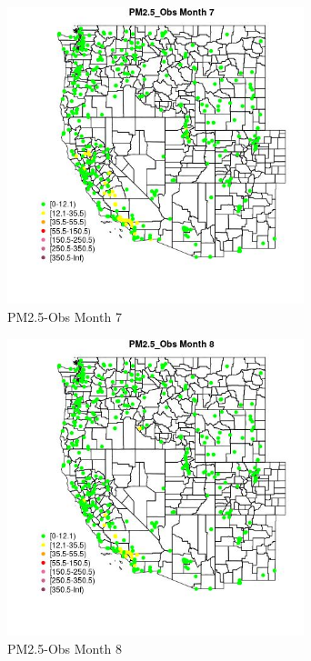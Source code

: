\begin{figure} 
\centering  
\includegraphics[width=0.77\textwidth]{Code_Outputs/ML_input_report_ML_input_PM25_Step5_part_d_de_duplicated_aves_ML_input_MapObsMo7PM25_Obs.jpg} 
\caption{\label{fig:ML_input_report_ML_input_PM25_Step5_part_d_de_duplicated_aves_ML_inputMapObsMo7PM25_Obs}PM2.5-Obs Month 7} 
\end{figure} 
 

\begin{figure} 
\centering  
\includegraphics[width=0.77\textwidth]{Code_Outputs/ML_input_report_ML_input_PM25_Step5_part_d_de_duplicated_aves_ML_input_MapObsMo8PM25_Obs.jpg} 
\caption{\label{fig:ML_input_report_ML_input_PM25_Step5_part_d_de_duplicated_aves_ML_inputMapObsMo8PM25_Obs}PM2.5-Obs Month 8} 
\end{figure} 
 

